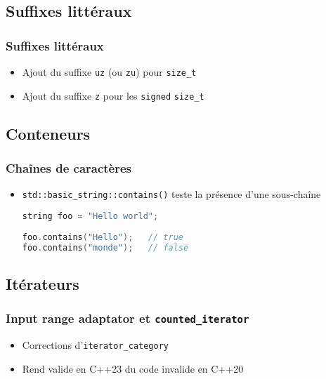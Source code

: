\documentclass[C++.tex]{subfiles}
\begin{document}
\subsection*{Suffixes littéraux}
\begin{frame}[fragile]
	\frametitle{Suffixes littéraux}
	\begin{itemize}
		\item Ajout du suffixe \lstinline|uz| (ou \lstinline|zu|) pour \lstinline|size_t|
		\item Ajout du suffixe \lstinline|z| pour les \og \lstinline|signed|\fg{} \lstinline|size_t|

	\end{itemize}
\end{frame}

\subsection*{Conteneurs}
\begin{frame}[fragile]
	\frametitle{Chaînes de caractères}
	\begin{itemize}
		\item \lstinline|std::basic_string::contains()| teste la présence d'une sous-chaîne

		\begin{lstlisting}[language=C++]
string foo = "Hello world";
	
foo.contains("Hello");   // true
foo.contains("monde");   // false\end{lstlisting}
	\end{itemize}


\end{frame}

\subsection*{Itérateurs}
\begin{frame}[fragile]
	\frametitle{Input range adaptator et \lstinline|counted_iterator|}
	\begin{itemize}
		\item Corrections d'\lstinline|iterator_category|
		\item Rend valide en C++23 du code invalide en C++20
	\end{itemize}
\end{frame}
\end{document}
